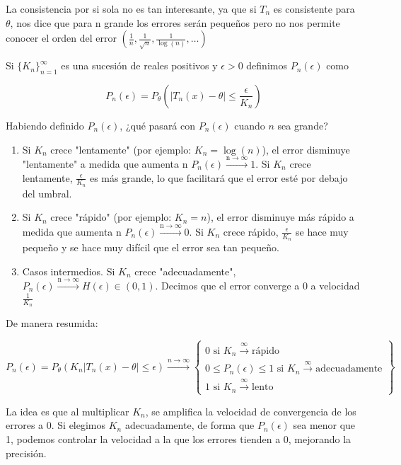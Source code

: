 La consistencia por si sola no es tan interesante, ya que si $T_n$ es consistente para $\theta$, nos dice que para n grande los errores serán pequeños pero no nos permite conocer el orden del error $\left(\frac{1}{n}, \frac{1}{\sqrt{n}},\frac{1}{\log(n)}, \dots\right)$

Si $\{K_n\}_{n=1}^{\infty}$ es una sucesión de reales positivos y $\epsilon>0$ definimos $P_n(\epsilon)$ como

\[P_n(\epsilon)=P_\theta(|T_n(x)-\theta| \leq \frac{\epsilon}{K_n})\]

Habiendo definido $P_n(\epsilon)$, ¿qué pasará con $P_n(\epsilon)$ cuando $n$ sea grande?
\begin{enumerate}
    \item Si $K_n$ crece "lentamente" (por ejemplo:  $K_n=\log(n)$), el error disminuye "lentamente" a medida que aumenta n $P_n(\epsilon) \xrightarrow{{\text{n} \to \infty}} 1$. Si $K_n$ crece lentamente, $ \frac{\epsilon}{K_n}$ es más grande, lo que facilitará que el error esté por debajo del umbral.
    \item Si $K_n$ crece "rápido" (por ejemplo:  $K_n=n$), el error disminuye más rápido a medida que aumenta n $P_n(\epsilon) \xrightarrow{{\text{n} \to \infty}} 0$.  Si $K_n$ crece rápido, $ \frac{\epsilon}{K_n}$ se hace muy pequeño y se hace muy difícil que el error sea tan pequeño.
    \item Casos intermedios. Si $K_n$ crece "adecuadamente", $P_n(\epsilon) \xrightarrow{{\text{n} \to \infty}} H(\epsilon) \in (0,1)$. Decimos que el error converge a 0 a velocidad $\frac{1}{K_n}$
\end{enumerate}

De manera resumida:

\[
    P_n(\epsilon) = P_\theta(K_n|T_n(x) - \theta| \leq \epsilon) \xrightarrow{n \to \infty}\begin{Bmatrix}
        0 \text{ si } K_n \xrightarrow{\infty} \text{rápido}                                  \\
        0 \leq P_n(\epsilon) \leq 1 \text{ si } K_n \xrightarrow{\infty} \text{adecuadamente} \\
        1 \text{ si } K_n \xrightarrow{\infty} \text{lento}
    \end{Bmatrix}
\]

La idea es que al multiplicar $K_n$, se amplifica la velocidad de convergencia de los errores a 0. Si elegimos $K_n$ adecuadamente, de forma que $P_n(\epsilon)$ sea menor que 1, podemos controlar la velocidad a la que los errores tienden a 0, mejorando la precisión.

